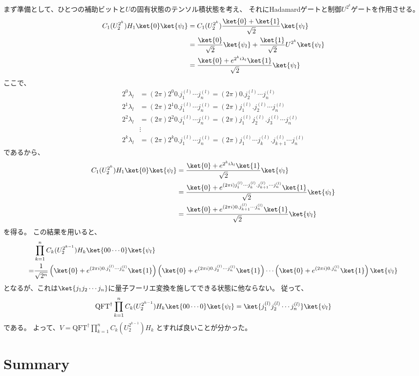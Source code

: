 \documentclass[]{ltjsarticle}
\begin{document}
まず準備として、ひとつの補助ビットと$U$の固有状態のテンソル積状態を考え、
それにHadamardゲートと制御$U^{2^k}$ゲートを作用させる。
\begin{align}
    C_1(U^{2^{k}}_{2}) H_1 \ket{0}\ket{\psi_l}
    &=
    C_1(U^{2^{k}}_{2}) 
    \frac{\ket{0} + \ket{1}}{\sqrt{2}}
    \ket{\psi_l} \\
    &=
    \frac{\ket{0}}{\sqrt{2}}
    \ket{\psi_l}
    +
    \frac{\ket{1}}{\sqrt{2}} 
    U^{2^{k}}\ket{\psi_l} \\
    &=
    \frac{\ket{0} + e^{2^ki\lambda_l} \ket{1}}{\sqrt{2}}
    \ket{\psi_l}
\end{align}
ここで、
\begin{align}
    2^0 \lambda_l 
    &=
    (2\pi) 2^0 0.j_1^{(l)} \cdots j_n^{(l)}
    =
    (2\pi) 0.j_2^{(l)} \cdots j_n^{(l)} \\
    2^1 \lambda_l 
    &=
    (2\pi) 2^1 0.j_1^{(l)} \cdots j_n^{(l)}
    =
    (2\pi) j_1^{(l)}.j_2^{(l)} \cdots j_n^{(l)} \\
    2^2 \lambda_l 
    &=
    (2\pi) 2^2 0.j_1^{(l)} \cdots j_n^{(l)}
    =
    (2\pi) j_1^{(l)}j_2^{(l)}.j_3^{(l)} \cdots j_n^{(l)} \\
    &\vdots \\
    2^k \lambda_l 
    &=
    (2\pi) 2^k 0.j_1^{(l)} \cdots j_n^{(l)}
    =
    (2\pi) j_1^{(l)} \cdots j_k^{(l)}.j_{k+1}^{(l)} \cdots j_n^{(l)}
\end{align}
であるから、
\begin{align}
    C_1(U^{2^{k}}_{2}) H_1 \ket{0}\ket{\psi_l}
    &=
    \frac{\ket{0} + e^{2^ki\lambda_l} \ket{1}}{\sqrt{2}}
    \ket{\psi_l} \\
    &=
    \frac{\ket{0} + e^{(2\pi i) j_1^{(l)} \cdots j_k^{(l)}.j_{k+1}^{(l)} \cdots j_n^{(l)}} \ket{1}}{\sqrt{2}}
    \ket{\psi_l} \\
    &=
    \frac{\ket{0} + e^{(2\pi i) 0.j_{k+1}^{(l)} \cdots j_n^{(l)}} \ket{1}}{\sqrt{2}}
    \ket{\psi_l}
\end{align}
を得る。
この結果を用いると、
\begin{align}
    &\prod_{k=1}^n C_k(U^{2^{k-1}}_{2}) H_k \ket{00\cdots 0}\ket{\psi_l} \\
    =
    &\frac{1}{\sqrt{2^n}}
    \left(
        \ket{0} + e^{(2\pi i) 0.j_{1}^{(l)} \cdots j_n^{(l)}} \ket{1}
    \right)
    \left(
        \ket{0} + e^{(2\pi i) 0.j_{2}^{(l)} \cdots j_n^{(l)}} \ket{1}
    \right)
    \cdots 
    \left(
        \ket{0} + e^{(2\pi i) 0.j_n^{(l)}} \ket{1}
    \right)
    \ket{\psi_l}
\end{align}
となるが、これは$\ket{j_1j_2 \cdots j_n}$に量子フーリエ変換を施してできる状態に他ならない。
従って、
\begin{align}
    \mathrm{QFT}^{\dagger }\prod_{k=1}^n C_k(U^{2^{k-1}}_{2}) H_k \ket{00\cdots 0}\ket{\psi_l} 
    =
    \ket{j_1^{(l)}j_2^{(l)} \cdots j_n^{(l)}}\ket{\psi_l}
\end{align}
である。
よって、$V = \mathrm{QFT}^{\dagger }\prod_{k=1}^n C_k(U^{2^{k-1}}_{2}) H_k$
とすれば良いことが分かった。



\section{Summary}


%
%
\end{document}
